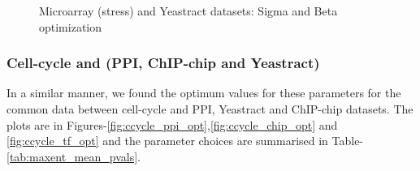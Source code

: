 \begin{figure}[htp]
\begin{center}
  \end{center}
  \caption{Microarray (stress) and Yeastract datasets: Sigma and Beta optimization}
  \label{fig:stress_tf_opt}
\end{figure}

\subsubsection{Cell-cycle and (PPI, ChIP-chip and Yeastract)}
In a similar manner, we found the optimum values for these parameters for the common data between cell-cycle and PPI, Yeastract and ChIP-chip datasets. The plots are in Figures-\ref{fig:ccycle_ppi_opt},\ref{fig:ccycle_chip_opt} and \ref{fig:ccycle_tf_opt} and the parameter choices are summarised in Table-\ref{tab:maxent_mean_pvals}.
\begin{figure}[htp]
  \begin{center}
     \\

\end{center}
\end{figure}
